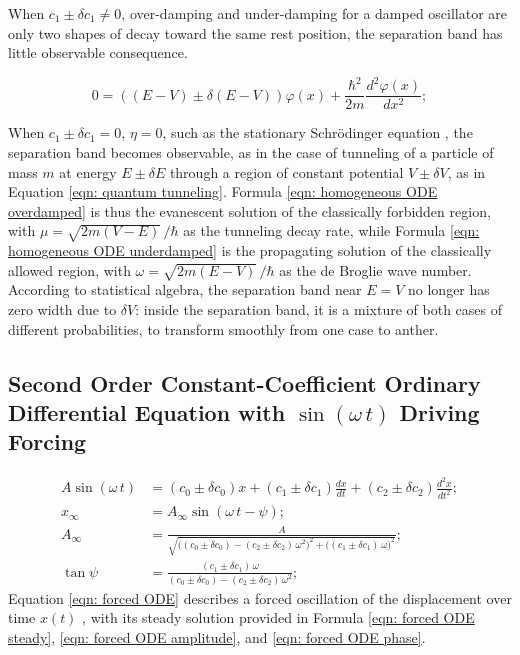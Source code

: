 \documentclass[twoside]{article}
\numberwithin{equation}{section}
\begin{document}
When $c_1 \pm \delta c_1 \neq 0$, over-damping and under-damping for a damped oscillator are only two shapes of decay toward the same rest position, the separation band has little observable consequence.

\begin{equation}
\label{eqn: quantum tunneling}
0 = \left( (E - V) \pm \delta (E - V) \right) \varphi(x) + \frac{\hbar^2}{2 m} \frac{d^2 \varphi(x)}{d x^2};
\end{equation}

When $c_1 \pm \delta c_1 = 0$, $\eta = 0$, such as the stationary Schrödinger equation \cite{Quantum_Mechanics}, the separation band becomes observable, as in the case of tunneling of a particle of mass $m$ at energy $E \pm \delta E$ through a region of constant potential $V \pm \delta V$, as in Equation \eqref{eqn: quantum tunneling}.
Formula \eqref{eqn: homogeneous ODE overdamped} is thus the evanescent solution of the classically forbidden region, with $\mu = \sqrt{2 m (V - E)}\,/\hbar$ as the tunneling decay rate, while Formula \eqref{eqn: homogeneous ODE underdamped} is the propagating solution of the classically allowed region, with $\omega = \sqrt{2 m (E - V)}\,/\hbar$ as the de Broglie wave number.
According to statistical algebra, the separation band near $E = V$ no longer has zero width due to $\delta V$: inside the separation band, it is a mixture of both cases of different probabilities, to transform smoothly from one case to anther.

\subsection{Second Order Constant-Coefficient Ordinary Differential Equation with $\sin(\omega\,t)$ Driving Forcing}

\begin{align}
\label{eqn: forced ODE}
A \sin(\omega\,t) &= (c_0 \pm \delta c_0) x + (c_1 \pm \delta c_1) \frac{d x}{d t} + (c_2 \pm \delta c_2) \frac{d^2 x}{d t^2}; \\
\label{eqn: forced ODE steady}
x_\infty &= A_\infty \sin(\omega\,t - \psi); \\
\label{eqn: forced ODE amplitude}
A_\infty &= \frac{A}{\sqrt{\big((c_0 \pm \delta c_0) - (c_2 \pm \delta c_2)\, \omega^2\big)^2 + \big((c_1 \pm \delta c_1)\, \omega\big)^2}}; \\
\label{eqn: forced ODE phase}
\tan\psi &= \frac{(c_1 \pm \delta c_1)\, \omega}{(c_0 \pm \delta c_0) - (c_2 \pm \delta c_2)\, \omega^2};
\end{align}
Equation \eqref{eqn: forced ODE} describes a forced oscillation of the displacement over time $x(t)$ \cite{Driven_Damped_Oscillator}, with its steady solution provided in Formula \eqref{eqn: forced ODE steady}, \eqref{eqn: forced ODE amplitude}, and \eqref{eqn: forced ODE phase}.
\end{document}
